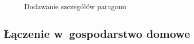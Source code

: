 \documentclass[12pt,a4paper,twoside,titlepage,openright]{book}
\begin{document}
\begin{figure}[h]
\begin{minipage}[t]{0.3\textwidth}
		\caption{Dodawanie szczegółów paragonu}
		\label{fig:app-dodajWydatek2}
	\end{minipage}
\end{figure}



\subsection{Łączenie w~gospodarstwo domowe}
\end{document}
